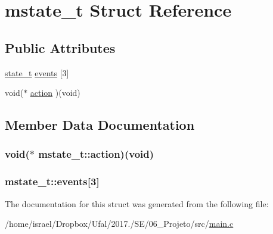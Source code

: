 \hypertarget{structmstate__t}{\section{mstate\-\_\-t Struct Reference}
\label{structmstate__t}
}
\subsection*{Public Attributes}
\begin{DoxyCompactItemize}
\item 
\hyperlink{main_8c_aa0aafed44fec19806d8f9ad834be1248}{state\-\_\-t} \hyperlink{structmstate__t_a48d34ab7b601a442a4cd544f19ad5373}{events} \mbox{[}3\mbox{]}
\item 
void($\ast$ \hyperlink{structmstate__t_aa77c995eafbc21b9874f8a411e5ca372}{action} )(void)
\end{DoxyCompactItemize}


\subsection{Member Data Documentation}
\hypertarget{structmstate__t_aa77c995eafbc21b9874f8a411e5ca372}{
\subsubsection[{action}]{\setlength{\rightskip}{0pt plus 5cm}void($\ast$ mstate\-\_\-t\-::action)(void)}}\label{structmstate__t_aa77c995eafbc21b9874f8a411e5ca372}
\hypertarget{structmstate__t_a48d34ab7b601a442a4cd544f19ad5373}{
\subsubsection[{events}]{ mstate\-\_\-t\-::events\mbox{[}3\mbox{]}}}\label{structmstate__t_a48d34ab7b601a442a4cd544f19ad5373}


The documentation for this struct was generated from the following file\-:\begin{DoxyCompactItemize}
\item 
/home/israel/\-Dropbox/\-Ufal/2017./\-S\-E/06\-\_\-\-Projeto/src/\hyperlink{main_8c}{main.\-c}\end{DoxyCompactItemize}
